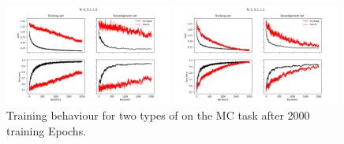 \begin{figure}[ht]
\includegraphics[width=0.49\textwidth]{figures/comparison/Epochs_2000--A_0.05--N_4--S_1--L_2.png}
\raggedright
\includegraphics[width=0.49\textwidth]{figures/comparison/Epochs_2000--A_0.05--N_5--S_1--L_1.png}
\caption[Ans{\"a}tze behaviour comparison for small datasets]{Training behaviour for two types of \mya on the MC task after 2000 training Epochs.}
\label{fig:test1}
\end{figure}
